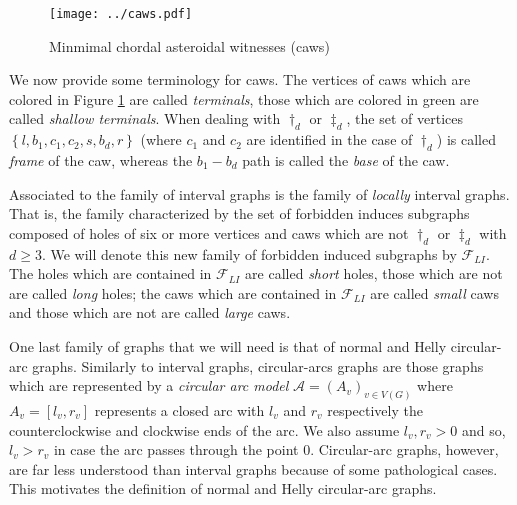 \documentclass{article}
\begin{document}
    \begin{figure}[h]
        \centering
        \texttt{[image: ../caws.pdf]}
        \caption{Minmimal chordal asteroidal witnesses (caws)}
        \label{caws}
    \end{figure}


    We now provide some
    terminology for caws.
    The vertices of caws
    which are colored in
    Figure \ref{caws} are called
    \emph{terminals},
    those which are
    colored in green
    are called
    \emph{shallow terminals}.
    When dealing
    with $\dagger_{d}$ or
    $\ddagger_{d}$,
    the set of vertices
    $\left\{l, b_1, c_1, c_2, s, b_d, r\right\}$
    (where $c_1$ and $c_2$ are
    identified in the case of $\dagger_{d}$)
    is called \emph{frame} of the caw,
    whereas the $b_1 - b_{d}$
    path is called the \emph{base}
    of the caw.

    Associated to the family 
    of interval graphs is the
    family of \emph{locally} interval
    graphs. That is, the family
    characterized by the set of forbidden
    induces subgraphs
    composed of holes
    of six or more vertices
    and caws which are
    not $\dagger_{d}$ or
    $\ddagger_{d}$ with
    $d \geq 3$.
    We will denote
    this new family of
    forbidden induced
    subgraphs by
    $\mathcal{F}_{LI}$.
    The holes which
    are contained
    in $\mathcal{F}_{LI}$ 
    are called \emph{short}
    holes, those which
    are not are called
    \emph{long} holes;
    the caws which
    are contained
    in $\mathcal{F}_{LI}$ 
    are called \emph{small} 
    caws and those
    which are not
    are called \emph{large}
    caws.

    One last family 
    of graphs that we
    will need is that
    of normal and Helly 
    circular-arc graphs.
    Similarly to interval
    graphs, circular-arcs
    graphs are those
    graphs which
    are represented
    by a \emph{circular arc 
    model} $\mathcal{A} = \left(A_{v}\right)_{v \in V\left(G\right)}$
    where $A_{v} = \left[l_{v}, r_{v}\right]$
    represents a closed arc
    with $l_{v}$ and $r_{v}$ respectively
    the counterclockwise and clockwise
    ends of the arc. We also
    assume $l_{v}, r_{v} > 0$ and
    so, $l_{v} > r_{v}$ in case
    the arc passes through the point $0$.
    Circular-arc graphs, however, 
    are far less understood than 
    interval graphs because of
    some pathological cases.
    This motivates the definition of
    normal and Helly circular-arc
    graphs.
\end{document}
